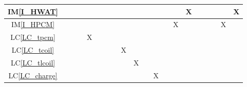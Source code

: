 \documentclass[12pt]{article}
\newcommand{\iref}[1]{IM\ref{#1}}
\newcommand{\lcref}[1]{LC\ref{#1}}
\begin{document}
{\begin{landscape}
\begin{table}[h!]
\begin{tabular}{|c|c|c|c|c|c|c|c|c|c|c|c|c|c|c|c|c|c|c|c|}
        \iref{I_HWAT}       &                            &                 &                &               &                        &                  &                    &                &                 &                   &                 &                   &                     & X                &                &                   &               &                    & X                 \\ \hline
        \iref{I_HPCM}       &                            &                 &                &               &                        &                  &                    &                &                 &                   &                 &                   & X                   &                  &                &                   &               & X                  &                   \\ \hline
        \lcref{LC_tpcm}     &                            &                 &                & X             &                        &                  &                    &                &                 &                   &                 &                   &                     &                  &                &                   &               &                    &                   \\ \hline
        \lcref{LC_tcoil}    &                            &                 &                &               &                        &                  &                    & X              &                 &                   &                 &                   &                     &                  &                &                   &               &                    &                   \\ \hline
        \lcref{LC_tlcoil}   &                            &                 &                &               &                        &                  &                    &                & X               &                   &                 &                   &                     &                  &                &                   &               &                    &                   \\ \hline
        \lcref{LC_charge}   &                            &                 &                &               &                        &                  &                    &                &                 &                   & X               &                   &                     &                  &                &                   &               &                    &                   \\ \hline

\end{tabular}
\end{table}
\end{landscape}}
\end{document}

